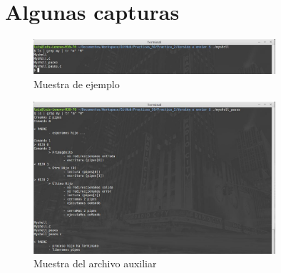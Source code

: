 \chapter{Algunas capturas}
\begin{figure}[htb]
\begin{center}
 \centering
 \includegraphics[width=0.8\textwidth]{./foto2}
 \caption{Muestra de ejemplo}
 \label{fig:Muestra de ejemplo}
\end{center}
\end{figure}

\begin{figure}[htb]
\begin{center}
 \centering
 \includegraphics[width=0.8\textwidth]{./foto1}
 \caption{Muestra del archivo auxiliar}
 \label{fig:Muestra del archivo auxiliar}
\end{center}
\end{figure}